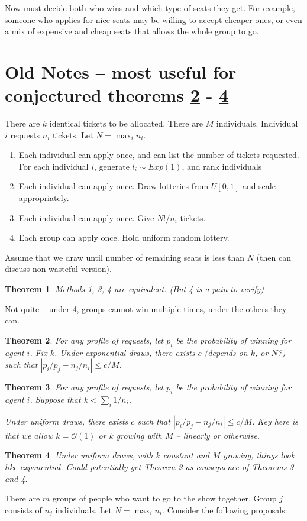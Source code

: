 \documentclass[11pt, oneside]{article}   	%
\newtheorem{theorem}{Theorem}
\newcommand{\na}[1]{{\color{blue} #1}}
\begin{document}
Now must decide both who wins and which type of seats they get. For example, someone who applies for nice seats may be willing to accept cheaper ones, or even a mix of expensive and cheap seats that allows the whole group to go.

\section{Old Notes -- most useful for conjectured theorems \ref{thm:2} - \ref{thm:4}}
There are $k$ identical tickets to be allocated. There are $M$ individuals. Individual $i$ requests $n_i$ tickets. Let $N = \max_i n_i$. 

\begin{enumerate}
\item Each individual can apply once, and can list the number of tickets requested. For each individual $i$, generate $l_i \sim Exp(1)$, and rank individuals 
\item Each individual can apply once. Draw lotteries from $U[0,1]$ and scale appropriately.
\item Each individual can apply once. Give $N!/n_i$ tickets.
\item Each group can apply once. Hold uniform random lottery. 
\end{enumerate}
\na{Assume that we draw until number of remaining seats is less than $N$ (then can discuss non-wasteful version).}


\begin{theorem}
Methods 1, 3, 4 are equivalent. (But 4 is a pain to verify)
\end{theorem}

\na{Not quite -- under 4, groups cannot win multiple times, under the others they can.}

\begin{theorem} \label{thm:2}
For any profile of requests, let $p_i$ be the probability of winning for agent $i$.  Fix $k$. Under exponential draws, there exists $c$ (depends on $k$, or $N$?) such that $|p_i/p_j - n_j/n_i| \leq c/M$.
\end{theorem}

\begin{theorem}
For any profile of requests, let $p_i$ be the probability of winning for agent $i$. Suppose that $k < \sum_i 1/n_i$. 

Under uniform draws, there exists $c$ such that $|p_i/p_j - n_j/n_i| \leq c/M$. \na{Key here is that we allow $k = \mathcal{O}(1)$ or $k$ growing with $M$ -- linearly or otherwise.}
\end{theorem}

\begin{theorem} \label{thm:4}
Under uniform draws, with $k$ constant and $M$ growing, things look like exponential. Could potentially get Theorem 2 as consequence of Theorems 3 and 4.
\end{theorem}



There are $m$ groups of people who want to go to the show together. Group $j$ consists of $n_j$ individuals. Let $N = \max_i n_i$. Consider the following proposals:
\end{document}
